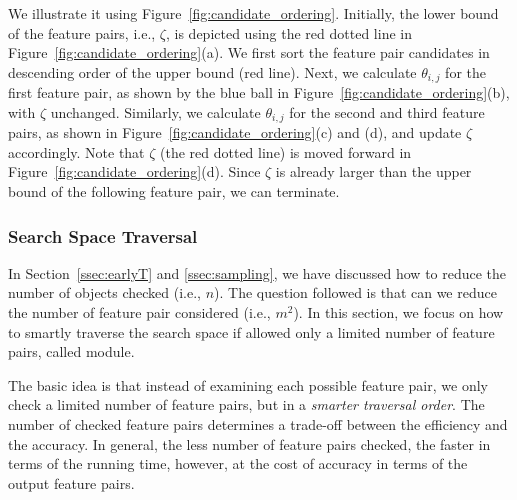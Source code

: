 \begin{example}
We illustrate it using Figure~\ref{fig:candidate_ordering}. Initially, the lower bound of the \topthree feature pairs, i.e., $\zeta$, is depicted using the red dotted line  in Figure~\ref{fig:candidate_ordering}(a). We first sort the feature pair candidates in descending order of the upper bound (red line). Next, we calculate $\theta_{i,j}$ for the first feature pair, as shown by the blue ball in Figure~\ref{fig:candidate_ordering}(b), with $\zeta$ unchanged. Similarly, we calculate $\theta_{i,j}$ for the second and third feature pairs, as shown in Figure~\ref{fig:candidate_ordering}(c) and (d), and update $\zeta$ accordingly. Note that $\zeta$ (the red dotted line) is moved forward in Figure~\ref{fig:candidate_ordering}(d). Since $\zeta$ is already larger than the upper bound of the following feature pair, we can terminate.
\end{example}

\subsubsection{Search Space Traversal} \label{ssec:traversal}
In Section~\ref{ssec:earlyT} and \ref{ssec:sampling}, we have discussed how to reduce the number of objects checked (i.e., $n$). The question followed is that can we reduce the number of feature pair considered (i.e., $m^2$). In this section, we focus on how to smartly traverse the search space if allowed only a limited number of feature pairs, called \traversal module. 

  The basic idea is that instead of examining each possible feature pair, we only check a limited number of feature pairs, but in a {\em smarter traversal order}. The number of checked feature pairs determines a trade-off between the efficiency and the accuracy. In general, the less number of feature pairs checked, the faster in terms of the running time, however, at the cost of accuracy in terms of the output \topk feature pairs. 

